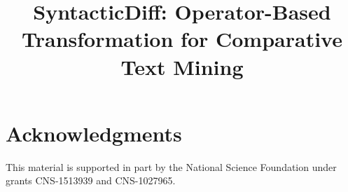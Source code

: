 \documentclass[10pt, conference, compsocconf]{IEEEtran}
\begin{document}
\sloppy %

\def\ignore#1{}

\title{SyntacticDiff: Operator-Based Transformation for Comparative Text Mining}

\author{%
        \vspace{.08in}
}
\maketitle









\section*{Acknowledgments}

This material is supported in part by the National Science Foundation under
grants CNS-15­13939 and CNS-1027965.

\newcommand{\BIBdecl}{\setlength{\itemsep}{0.2 em}}


\end{document}
